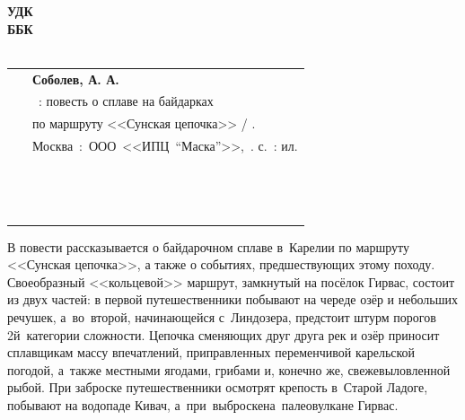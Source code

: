 {
\thispagestyle{empty}
%
\small{
\begin{flushleft}
\textbf{%
	УДК \UDK \\
	ББК \BBK \\
	\BibCode \\
}
\end{flushleft}
%
\vspace{1cm}
%
\begin{flushright}
{
\begin{tabular}[c]{>{\raggedright}m{10mm} >{\raggedright}m{99mm} }
	~ & \textbf{Соболев, А. А.} \tabularnewline
	\textbf{\BibCode} & \MyVarBookName~: повесть о сплаве на байдарках \tabularnewline
	~ & по маршруту <<Сунская цепочка>> / {\MyVarAuthorName}.\mdash \tabularnewline
	~ & Москва~:~ООО~<<ИПЦ~"`Маска"'>>,~\year.\mdash \pageref{LastPage} с.~: ил.\mdash \tabularnewline
	~ & \ISBN \tabularnewline	
	~ & ~ \tabularnewline
	~ & \ciao{16+}
\end{tabular}
}
\end{flushright}
%
\hspace{1.0cm} В повести рассказывается о байдарочном сплаве в~Карелии по маршруту <<Сунская цепочка>>, а также о событиях, предшествующих этому походу. Своеобразный <<кольцевой>> маршрут, замкнутый на посёлок Гирвас, состоит из двух частей: в первой путешественники побывают на череде озёр и небольших речушек, а~во~второй, начинающейся с~Линдозера, предстоит штурм порогов 2\sdash й~категории сложности. Цепочка сменяющих друг друга рек и озёр приносит сплавщикам массу впечатлений, приправленных переменчивой карельской погодой, а~также местными ягодами, грибами и, конечно же, свежевыловленной рыбой. При заброске путешественники осмотрят крепость в~Старой Ладоге, побывают на водопаде Кивач, а~при~выброске\mdash на~палеовулкане Гирвас.

}}
